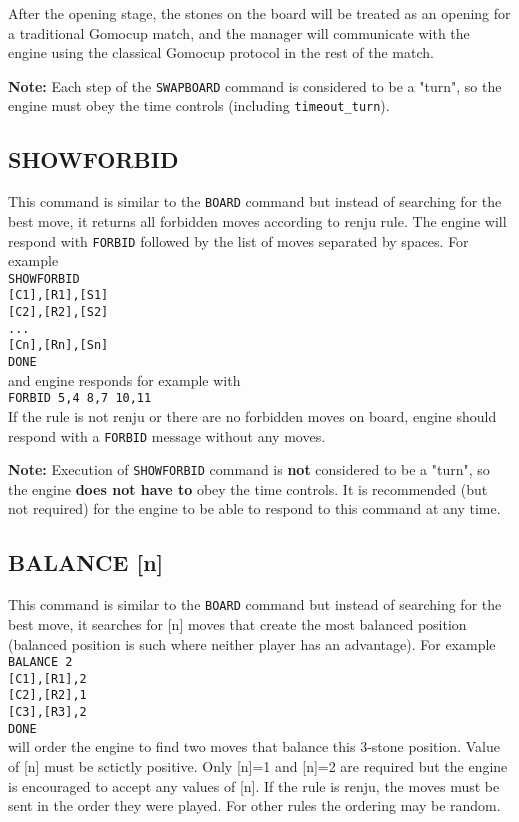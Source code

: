 \documentclass[12pt,a4paper]{article}
\begin{document}
After the opening stage, the stones on the board will be treated as an opening for a traditional Gomocup match, and the manager will communicate with the engine using the classical Gomocup protocol in the rest of the match.

\textbf{Note:} Each step of the \texttt{SWAPBOARD} command is considered to be a "turn", so the engine must obey the time controls (including \texttt{timeout{\_}turn}).


\subsection{SHOWFORBID}
\label{cmd_showforbid}
This command is similar to the \texttt{BOARD} command but instead of searching for the best move, it returns all forbidden moves according to renju rule. The engine will respond with \texttt{FORBID} followed by the list of moves separated by spaces. For example\\
\texttt{SHOWFORBID}\\
\texttt{[C1],[R1],[S1]} \\
\texttt{[C2],[R2],[S2]} \\
\texttt{...}\\
\texttt{[Cn],[Rn],[Sn]} \\
\texttt{DONE}\\
and engine responds for example with\\
\texttt{FORBID 5,4 8,7 10,11}\\
If the rule is not renju or there are no forbidden moves on board, engine should respond with a \texttt{FORBID} message without any moves.

\textbf{Note:} Execution of \texttt{SHOWFORBID} command is \textbf{not} considered to be a "turn", so the engine \textbf{does not have to} obey the time controls. It is recommended (but not required) for the engine to be able to respond to this command at any time.


\subsection{BALANCE [n]}
\label{cmd_balance}
This command is similar to the \texttt{BOARD} command but instead of searching for the best move, it searches for [n] moves that create the most balanced position (balanced position is such where neither player has an advantage). For example\\
\texttt{BALANCE 2} \\
\texttt{[C1],[R1],2} \\
\texttt{[C2],[R2],1} \\
\texttt{[C3],[R3],2} \\
\texttt{DONE}\\
will order the engine to find two moves that balance this 3-stone position. Value of [n] must be sctictly positive. Only [n]=1 and [n]=2 are required but the engine is encouraged to accept any values of [n]. If the rule is renju, the moves must be sent in the order they were played. For other rules the ordering may be random.
\end{document}
